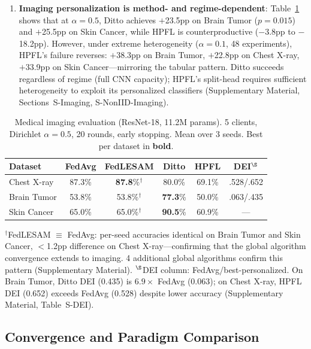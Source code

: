\documentclass[conference]{IEEEtran}
\begin{document}
\begin{enumerate}
    \item \textbf{Imaging personalization is method- and regime-dependent}: Table~\ref{tab:imaging_main} shows that at $\alpha{=}0.5$, Ditto achieves $+$23.5pp on Brain Tumor ($p{=}0.015$) and $+$25.5pp on Skin Cancer, while HPFL is counterproductive ($-$3.8pp to $-$18.2pp). However, under extreme heterogeneity ($\alpha{=}0.1$, 48 experiments), HPFL's failure reverses: $+$38.3pp on Brain Tumor, $+$22.8pp on Chest X-ray, $+$33.9pp on Skin Cancer---mirroring the tabular pattern. Ditto succeeds regardless of regime (full CNN capacity); HPFL's split-head requires sufficient heterogeneity to exploit its personalized classifiers (Supplementary Material, Sections~S-Imaging, S-NonIID-Imaging).
\end{enumerate}

\begin{table}[htbp]
\centering
\caption{Medical imaging evaluation (ResNet-18, 11.2M params). 5 clients, Dirichlet $\alpha{=}0.5$, 20 rounds, early stopping. Mean over 3 seeds. Best per dataset in \textbf{bold}.}
\label{tab:imaging_main}
\small
\begin{tabular}{lccccc}
\toprule
\textbf{Dataset} & \textbf{FedAvg} & \textbf{FedLESAM} & \textbf{Ditto} & \textbf{HPFL} & \textbf{DEI$^\S$} \\
\midrule
Chest X-ray & 87.3\% & \textbf{87.8}\%$^\dagger$ & 80.0\% & 69.1\% & .528/.652 \\
Brain Tumor & 53.8\% & 53.8\%$^\dagger$ & \textbf{77.3}\% & 50.0\% & .063/.435 \\
Skin Cancer & 65.0\% & 65.0\%$^\dagger$ & \textbf{90.5}\% & 60.9\% & --- \\
\bottomrule
\end{tabular}

\vspace{1mm}
\footnotesize{$^\dagger$FedLESAM $\equiv$ FedAvg: per-seed accuracies identical on Brain Tumor and Skin Cancer, $<$1.2pp difference on Chest X-ray---confirming that the global algorithm convergence extends to imaging. 4 additional global algorithms confirm this pattern (Supplementary Material). $^\S$DEI column: FedAvg/best-personalized. On Brain Tumor, Ditto DEI (0.435) is $6.9\times$ FedAvg (0.063); on Chest X-ray, HPFL DEI (0.652) exceeds FedAvg (0.528) despite lower accuracy (Supplementary Material, Table~S-DEI).}
\end{table}

\subsection{Convergence and Paradigm Comparison}
\end{document}
